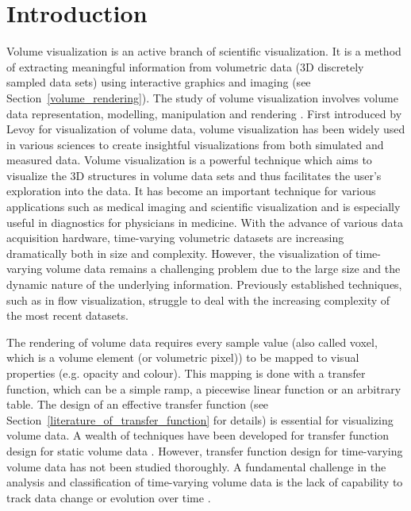 \chapter{Introduction \label{section_introduction}}
Volume visualization is an active branch of scientific visualization. It is a method of extracting meaningful information from volumetric data (3D discretely sampled data sets) using interactive graphics and imaging (see Section~\ref{volume_rendering}). The study of volume visualization involves volume data representation, modelling, manipulation and rendering \cite{kaufman_volume_1997}.
First introduced by Levoy \cite{levoy_display_1988} for visualization of volume data, volume visualization has been widely used in various sciences to create insightful visualizations from both simulated and measured data.
Volume visualization is a powerful technique which aims to visualize the 3D structures in volume data sets and thus facilitates the user's exploration into the data. It has become an important technique for various applications such as medical imaging and scientific visualization and is especially useful in diagnostics for physicians in medicine.
With the advance of various data acquisition hardware,
time-varying volumetric datasets are increasing dramatically both in size and complexity. However, the visualization of time-varying volume data remains a challenging problem due to the large size and the dynamic nature of the underlying information.
Previously established techniques, such as in flow visualization, struggle to deal with the increasing complexity of the most recent datasets.

The rendering of volume data requires every sample value (also called voxel, which is a volume element (or volumetric pixel)) to be mapped to visual properties (e.g. opacity and colour). This mapping is done with a transfer function, which can be a simple ramp, a piecewise linear function or an arbitrary table.
The design of an effective transfer function (see Section~\ref{literature_of_transfer_function} for details) is essential for visualizing volume data. A wealth of techniques have been developed for transfer function design for static volume data \cite{kindlmann_semi-automatic_1998} \cite{pfister_transfer_2001} \cite{kniss_multidimensional_2002} \cite{bernardon_transfer-function_2008} \cite{arens_survey_2010}. However, transfer function design for time-varying volume data has not been studied thoroughly. %
A fundamental challenge in the analysis and classification of time-varying volume data is the lack of capability to %
track data change or evolution over time \cite{gu_transgraph_2011}.

